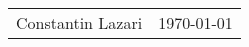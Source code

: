 \documentclass[12pt, a4paper, answers]{exam} %
\newcommand{\myAuthor}{Constantin Lazari}
\begin{document}
	\begin{tabularx}{\textwidth}{Xr}
	\myAuthor & \today\\
	\end{tabularx}
	\begin{questions}
	
	\end{questions}
\end{document}
